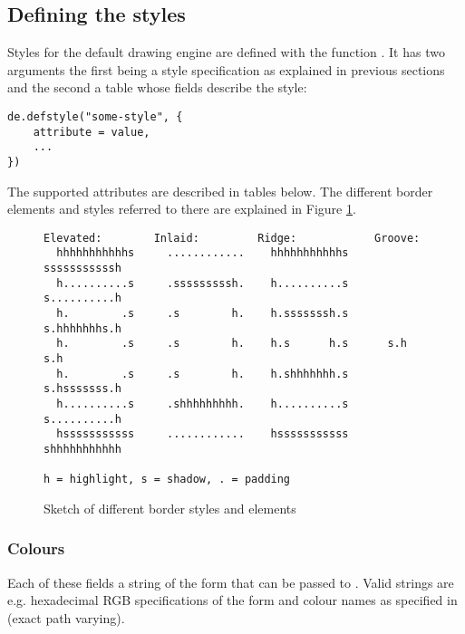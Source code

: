 \subsection{Defining the styles}

Styles for the default drawing engine are defined with the
function . It has two arguments the first being
a style specification as explained in previous sections and the second
a table whose fields describe the style:

\begin{verbatim}
de.defstyle("some-style", {
    attribute = value,
    ...
})
\end{verbatim}

The supported attributes are described in tables below. The different
border elements and styles referred to there are explained in Figure
\ref{fig:borders}.

\begin{figure}
\begin{htmlonly}
\docode %
\end{htmlonly}    
\begin{verbatim}
Elevated:        Inlaid:         Ridge:            Groove:        
  hhhhhhhhhhhs     ............	   hhhhhhhhhhhs      sssssssssssh
  h..........s     .sssssssssh.	   h..........s      s..........h
  h.        .s     .s        h.	   h.sssssssh.s      s.hhhhhhhs.h
  h.        .s     .s        h.	   h.s      h.s      s.h      s.h
  h.        .s     .s        h.	   h.shhhhhhh.s      s.hsssssss.h
  h..........s     .shhhhhhhhh.	   h..........s      s..........h
  hsssssssssss     ............	   hsssssssssss      shhhhhhhhhhh

h = highlight, s = shadow, . = padding
\end{verbatim}
\caption{Sketch of different border styles and elements}
\label{fig:borders}
\end{figure}

\subsubsection{Colours}

Each of these fields a string of the form that can be
passed to . Valid strings are e.g.
hexadecimal RGB specifications of the form
 and colour names as specified
in  (exact path varying).

